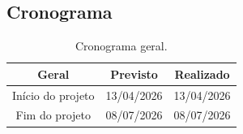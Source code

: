 \begin{landscape}

\chapter{Cronograma} 

\begin{table}[htpb]
\begin{center}
\caption{Cronograma geral.}
\begin{tabular}{|c|c|c|}
\hline
\textbf{Geral}          & \textbf{Previsto} & \textbf{Realizado} \\ \hline
Início do projeto       & 13/04/2026        & 13/04/2026         \\ \hline
Fim do projeto          & 08/07/2026        & 08/07/2026         \\ \hline
\end{tabular}
\end{center}
\end{table}



\end{landscape}
